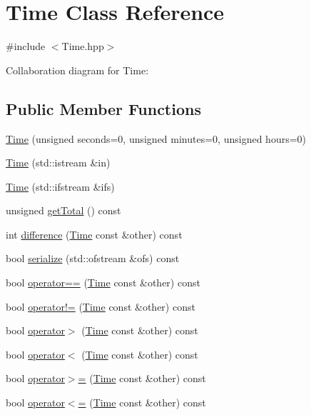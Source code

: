 \hypertarget{classTime}{}\section{Time Class Reference}
\label{classTime}


{\ttfamily \#include $<$Time.\+hpp$>$}



Collaboration diagram for Time\+:
\subsection*{Public Member Functions}
\begin{DoxyCompactItemize}
\item 
\hyperlink{classTime_a393f1af1f9496b8833e3207f99325167}{Time} (unsigned seconds=0, unsigned minutes=0, unsigned hours=0)
\item 
\hyperlink{classTime_a85ec464631df4b1284f2e0d53f549750}{Time} (std\+::istream \&in)
\item 
\hyperlink{classTime_a9f96dc51f4ad6a98493ebc129b8f125a}{Time} (std\+::ifstream \&ifs)
\item 
unsigned \hyperlink{classTime_ac64625b85a2497986774edcc8dde50e9}{get\+Total} () const
\item 
int \hyperlink{classTime_af02e08b3bf203d9cedbf9f629cddcc1f}{difference} (\hyperlink{classTime}{Time} const \&other) const
\item 
bool \hyperlink{classTime_acab7dbc13c8a0d9a0f33047d41f4aee0}{serialize} (std\+::ofstream \&ofs) const
\item 
bool \hyperlink{classTime_a682cdf808ba44f29b2e33ed257906a10}{operator==} (\hyperlink{classTime}{Time} const \&other) const
\item 
bool \hyperlink{classTime_a04c5a1b7338a14253ab3797afe39316d}{operator!=} (\hyperlink{classTime}{Time} const \&other) const
\item 
bool \hyperlink{classTime_a6d544b6af2fd13223a5436d34964fe3a}{operator$>$} (\hyperlink{classTime}{Time} const \&other) const
\item 
bool \hyperlink{classTime_a334738a8a0f1f8d1e6ec15d0128ad5d3}{operator$<$} (\hyperlink{classTime}{Time} const \&other) const
\item 
bool \hyperlink{classTime_a1f7d030e8a6095b0bcd41bf4c5db3719}{operator$>$=} (\hyperlink{classTime}{Time} const \&other) const
\item 
bool \hyperlink{classTime_a31ca86633797092eb6f997e17dd1a267}{operator$<$=} (\hyperlink{classTime}{Time} const \&other) const

\end{DoxyCompactItemize}
